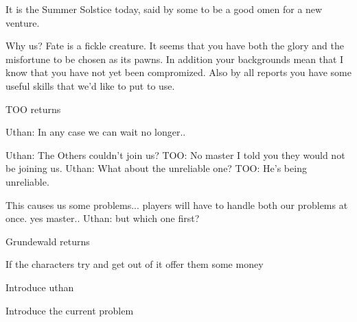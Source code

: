 \documentclass[a4paper]{dnd5}
\begin{document}
\begin{precis}
\item It is the Summer Solstice today, said by some to be a good omen for a new venture.

\item Why us?
  Fate is a fickle creature.  It seems that you have both the glory and the misfortune to be chosen as its pawns.  In addition your backgrounds mean that I know that you have not yet been compromized.  Also by all reports you have some useful skills that we'd like to put to use.

\item TOO returns
\item Uthan: In any case we can wait no longer.. 
\item Uthan: The Others couldn't join us?  
TOO: No master I told you they would not be joining us.
Uthan: What about the unreliable one?  
TOO: He's being unreliable.  
\item This causes us some problems... players will have to handle both our problems at once.
yes master.. 
Uthan: but which one first?
\item Grundewald returns
\end{precis}


\begin{outs} 
\item If the characters try and get out of it offer them some money
\end{outs}

\begin{purpose}
\item Introduce uthan
\item Introduce the current problem 
\end{purpose}
     
\end{document}
